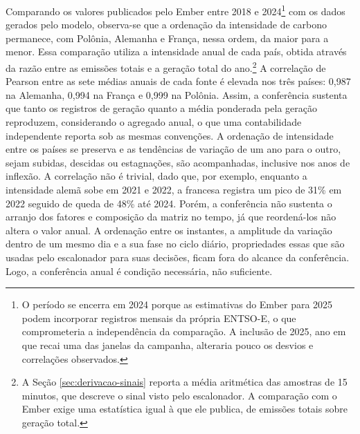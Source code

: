 Comparando os valores publicados pelo Ember entre 2018 e 2024\footnote{O período se encerra em 2024 porque as estimativas do Ember
para 2025 podem incorporar registros mensais da própria ENTSO-E, o que comprometeria a independência da comparação. A inclusão de 2025, ano 
em que recai uma das janelas da campanha, alteraria pouco os desvios e correlações observados.} com os
dados gerados pelo modelo, observa-se que a ordenação da intensidade de carbono permanece, com Polônia, Alemanha e França, nessa
ordem, da maior para a menor. Essa comparação utiliza a intensidade anual de cada país, obtida através da razão entre
as emissões totais e a geração total do ano.\footnote{A Seção \ref{sec:derivacao-sinais} reporta a média aritmética das amostras de 15 minutos,
que descreve o sinal visto pelo escalonador. A comparação com o Ember exige uma estatística igual à que ele publica, de emissões totais 
sobre geração total.} A correlação de Pearson entre as sete médias anuais de cada fonte é elevada nos três países: 0,987 na Alemanha,
0,994 na França e 0,999 na Polônia. Assim, a conferência
sustenta que tanto os registros de geração quanto a média ponderada pela geração reproduzem, considerando o agregado anual, o que uma
contabilidade independente reporta sob as mesmas convenções. A ordenação de intensidade entre os países se preserva e as tendências
de variação de um ano para o outro, sejam subidas, descidas ou estagnações, são acompanhadas, inclusive nos anos de inflexão. A correlação
não é trivial, dado que, por exemplo, enquanto a intensidade alemã sobe em 2021 e 2022, a francesa registra um pico de 31\% em 2022 
seguido de queda de 48\% até 2024. Porém, 
a conferência não sustenta o arranjo dos fatores e composição da matriz no tempo, já que reordená-los não altera o valor anual.
A ordenação entre os instantes, a amplitude da variação dentro de um mesmo dia e a sua fase no ciclo diário, propriedades essas que
são usadas pelo escalonador para suas decisões, ficam fora do alcance da conferência. Logo, a conferência anual é condição
necessária, não suficiente.

